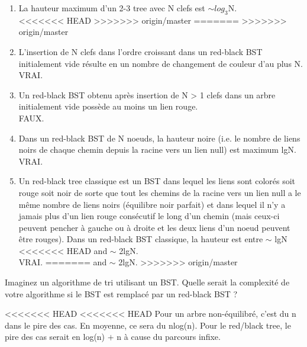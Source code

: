 \documentclass[11pt]{article}
\begin{document}
\begin{enumerate}
\item La hauteur maximum d'un 2-3 tree avec N clefs est $\sim log_3$N.\\

<<<<<<< HEAD
>>>>>>> origin/master
=======
>>>>>>> origin/master

\item L'insertion de N clefs dans l'ordre croissant dans un red-black BST initialement
vide résulte en un nombre de changement de couleur d'au plus N.\\

{\color{dkgreen}VRAI.}

\item Un red-black BST obtenu après insertion de N > 1 clefs dans un arbre initialement
vide possède au moins un lien rouge.\\

{\color{dkgreen}FAUX.}


\item Dans un red-black BST de N noeuds, la hauteur noire (i.e. le nombre de liens
noirs de chaque chemin depuis la racine vers un lien null) est maximum lgN.\\

{\color{dkgreen}VRAI.}

\item Un red-black tree classique est un BST dans lequel les liens sont colorés soit
rouge soit noir de sorte que tout les chemins de la racine vers un lien null a
le même nombre de liens noirs (équilibre noir parfait) et dans lequel il n'y
a jamais plus d'un lien rouge consécutif le long d'un chemin (mais ceux-ci
peuvent pencher à gauche ou à droite et les deux liens d'un noeud peuvent
être rouges). Dans un red-black BST classique, la hauteur est entre $\sim$ lgN
<<<<<<< HEAD
and $\sim$ 2lgN.\\

{\color{dkgreen}VRAI.}
=======
and $\sim$ 2lgN.
>>>>>>> origin/master
\end{enumerate}
\item Imaginez un algorithme de tri utilisant un BST. Quelle serait la complexité de
votre algorithme si le BST est remplacé par un red-black BST ?


<<<<<<< HEAD
<<<<<<< HEAD
{\color{dkgreen}Pour un arbre non-équilibré, c'est du n dans le pire des cas. En moyenne, ce sera du nlog(n). Pour le red/black tree, le pire des cas serait en log(n) $+$ n à cause du parcours infixe.}
\end{document}
